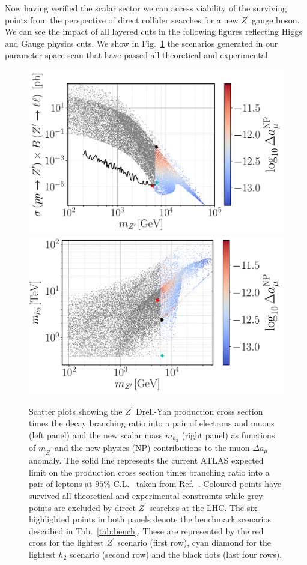 \documentclass[10pt]{report}
\begin{document}
Now having verified the scalar sector we can access viability of the surviving points from the perspective of direct collider searches for a new $Z^\prime$ gauge boson. We can see the impact of all layered cuts in the following figures reflecting Higgs and Gauge physics cuts. We show in Fig.~\ref{fig:Plots1} the scenarios generated in our parameter space scan that have passed all theoretical and experimental.
%
\begin{figure}[!htb]
	\centering
	\includegraphics[scale=0.37]{Images/BLSM_2/mZp_Xsec_Amu.pdf}
	\includegraphics[scale=0.37]{Images/BLSM_2/mZp_Mhp_Amu.pdf}
	\caption{Scatter plots showing the $Z^\prime$ Drell-Yan production cross section times the decay branching ratio into a pair of electrons and muons (left panel) and the new scalar mass $m_{h_2}$ (right panel) as functions of $m_{Z^\prime}$ and the new physics (NP) contributions 
	to the muon $\Delta a_\mu$ anomaly. The solid line represents the current ATLAS expected limit on the production cross section times branching ratio into a pair of leptons at $95\%$ C.L.~ taken from Ref.~\cite{Aad:2019fac}.  Coloured points have survived all theoretical and experimental 
	constraints while grey points are excluded by direct $Z^\prime$ searches at the LHC. The six highlighted points in both panels denote the benchmark scenarios described in Tab.~\ref{tab:bench}. These are represented by the red cross for the lightest $Z^\prime$ scenario (first row), cyan diamond for the lightest $h_2$ scenario (second row) and the black dots (last four rows).}
	\label{fig:Plots1}
\end{figure}	
\end{document}
